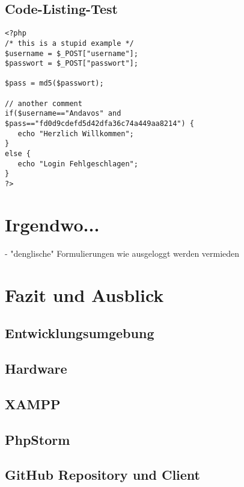 \documentclass[12pt,a4paper,titlepage]{article} %
\begin{document}



\subsection{Code-Listing-Test}
\begin{lstlisting}
<?php
/* this is a stupid example */
$username = $_POST["username"];
$passwort = $_POST["passwort"];

$pass = md5($passwort);

// another comment
if($username=="Andavos" and
$pass=="fd0d9cdefd5d42dfa36c74a449aa8214") {
   echo "Herzlich Willkommen";
}
else {
   echo "Login Fehlgeschlagen";
}
?>
\end{lstlisting}

\clearpage
\newpage

\section{Irgendwo...}
- "denglische" Formulierungen wie ausgeloggt werden vermieden

\section{Fazit und Ausblick} %



\clearpage
\newpage
\begin{appendix}


\section{Entwicklungsumgebung}
\subsection{Hardware}
\subsection{XAMPP}
\subsection{PhpStorm}
\subsection{GitHub Repository und Client}
\end{appendix}
\end{document}
